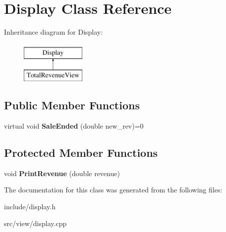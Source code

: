 \hypertarget{classDisplay}{}\section{Display Class Reference}
\label{classDisplay}
Inheritance diagram for Display\+:\begin{figure}[H]
\begin{center}
\leavevmode
\includegraphics[height=2.000000cm]{classDisplay}
\end{center}
\end{figure}
\subsection*{Public Member Functions}
\begin{DoxyCompactItemize}
\item 
\mbox{\label{classDisplay_a63abcba05da693e6848878cfdd840ad9}} 
virtual void {\bfseries Sale\+Ended} (double new\+\_\+rev)=0
\end{DoxyCompactItemize}
\subsection*{Protected Member Functions}
\begin{DoxyCompactItemize}
\item 
\mbox{\label{classDisplay_a0e4a16bdbdaf319a1b690c264471507e}} 
void {\bfseries Print\+Revenue} (double revenue)
\end{DoxyCompactItemize}


The documentation for this class was generated from the following files\+:\begin{DoxyCompactItemize}
\item 
include/display.\+h\item 
src/view/display.\+cpp\end{DoxyCompactItemize}
